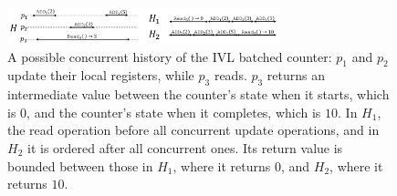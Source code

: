 \begin{figure}[b]
    \centering
    \includegraphics[width=0.7\textwidth]{graphics/ivl/adderIVL.png}
    \caption{A possible concurrent history of the IVL batched counter: $p_1$ and
    $p_2$ update their local registers, while $p_3$ reads. $p_3$ returns an intermediate
    value between the counter's state when it starts, which is $0$, and the counter's state when it completes, which is $10$.
    In $H_1$, the {\sc read} operation before all concurrent {\sc update} operations,
    and in $H_2$ it is ordered after all concurrent ones. Its return value is bounded between
    those in $H_1$, where it returns $0$, and $H_2$, where it returns $10$.}
    \label{ivl-img:adderIVL}
\end{figure}

